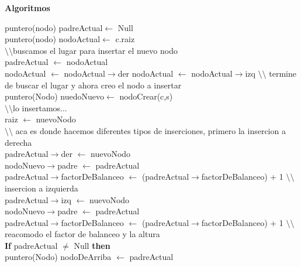 \documentclass[a4paper,10pt]{article}
\newenvironment{Algoritmos}{%
  \vspace*{2ex}%
  \noindent\textbf{\Large Algoritmos}%
  \vspace*{2ex}%
}{}
\begin{document}
\begin{Algoritmos}
\begin{algorithm}[H]
\end{algorithm}
\newline
\begin{algorithm}[H]
{puntero(nodo) padreActual$\leftarrow$ Null\\}
{puntero(nodo) nodoActual$\leftarrow$ c.raiz\\}
{$\setminus$$\setminus$buscamos el lugar para insertar el nuevo nodo\\}
{padreActual $\leftarrow$ nodoActual\\
{
{nodoActual $\leftarrow$ nodoActual$\rightarrow$der}
{nodoActual $\leftarrow$ nodoActual$\rightarrow$izq}
}
}
{$\setminus$$\setminus$ termine de buscar el lugar y ahora creo el nodo a insertar\\}
{puntero(Nodo) nuedoNuevo$\leftarrow$ nodoCrear(c,s)\\}
{$\setminus$$\setminus$lo insertamos...\\}
{
{raiz $\leftarrow$ nuevoNodo\\}
{$\setminus$$\setminus$ aca es donde hacemos diferentes tipos de inserciones, primero la insercion a derecha\\
{
{padreActual$\rightarrow$der $\leftarrow$ nuevoNodo\\
nodoNuevo$\rightarrow$padre $\leftarrow$ padreActual\\
padreActual$\rightarrow$factorDeBalanceo $\leftarrow$ (padreActual$\rightarrow$factorDeBalanceo) + 1}
{}
}
{$\setminus$$\setminus$ insercion a izquierda\\}
{
{padreActual$\rightarrow$izq $\leftarrow$ nuevoNodo\\
nodoNuevo$\rightarrow$padre $\leftarrow$ padreActual\\
padreActual$\rightarrow$factorDeBalanceo $\leftarrow$ (padreActual$\rightarrow$factorDeBalanceo) + 1}
{}
}
}
{$\setminus$$\setminus$ reacomodo el factor de balanceo y la altura\\}
{\textbf{If} {padreActual $\neq$ Null} \textbf{then}\\}
{ puntero(Nodo) nodoDeArriba $\leftarrow$ padreActual\\
    {
}}}
\end{algorithm}
\end{Algoritmos}
\end{document}
